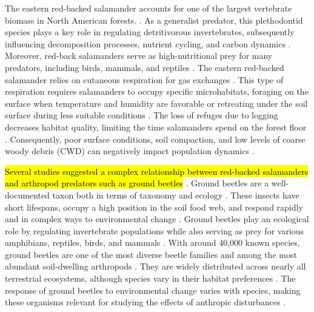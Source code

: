 The eastern red-backed salamander accounts for one of the largest vertebrate biomass in North American forests. \citep{Burton1975Salamanderpopulations,Petranka1993Effectstimber,semlitschAbundanceBiomassProduction2014a}. 
As a generalist predator, this plethodontid species plays a key role in regulating detritivorous invertebrates, subsequently influencing decomposition processes, nutrient cycling, and carbon dynamics \citep{Burton1975Energyflow,Wyman1998Experimentalassessment,Walton2013Topdownregulation,Hickerson2017Easternredbacked}. 
Moreover, red-back salamanders serve as high-nutritional prey for many predators, including birds, mammals, and reptiles \citep{Burton1975Energyflow,Pough1987abundancesalamanders}. 
The eastern red-backed salamander relies on cutaneous respiration for gas exchanges \citep{Heatwole1961Relationsubstrate}. 
This type of respiration requires salamanders to occupy specific microhabitats, foraging on the surface when temperature and humidity are favorable or retreating under the soil surface during less suitable conditions \citep{Grizzell1949HibernationSite,FraserEmpiricalEvaluation1976,Jaeger1980MicrohabitatsTerrestrial}. 
The loss of refuges due to logging decreases habitat quality, limiting the time salamanders spend on the forest floor \citep{Achat2015Quantifyingconsequences,Peele2017Effectswoody}. 
Consequently, poor surface conditions, soil compaction, and low levels of coarse woody debris (CWD) can negatively impact population dynamics \citep{Peterman2014Spatialvariation}. 

\hl{Several studies suggested a complex relationship between red-backed salamanders and arthropod predators such as ground beetles} \citep{Gall2003BehavioralInteractions,Walton2006Salamandersforestfloor,Hickerson2018Behavioralinteractions}. 
Ground beetles are a well-documented taxon both in terms of taxonomy and ecology \citep{loveiEcologyBehaviorGround1996}. 
These insects have short lifespans, occupy a high position in the soil food web, and respond rapidly and in complex ways to environmental change \citep{loveiEcologyBehaviorGround1996}. 
Ground beetles play an ecological role by regulating invertebrate populations while also serving as prey for various amphibians, reptiles, birds, and mammals \citep{loveiEcologyBehaviorGround1996}. 
With around 40,000 known species, ground beetles are one of the most diverse beetle families and among the most abundant soil-dwelling arthropods \citep{Erwin1985taxonpulse,loveiEcologyBehaviorGround1996,Rochefort2006GroundBeetle}. 
They are widely distributed across nearly all terrestrial ecosystems, although species vary in their habitat preferences \citep{loveiEcologyBehaviorGround1996,kotzeFortyYearsCarabid2011a,Larochelle2003naturalhistory}. 
The response of ground beetles to environmental change varies with species, making these organisms relevant for studying the effects of anthropic disturbances \citep{Rainio2003Groundbeetles}. 

